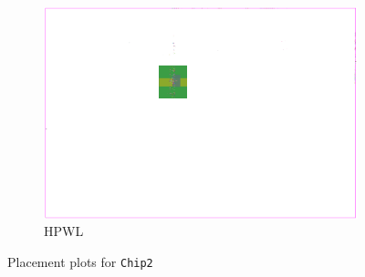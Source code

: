 \begin{figure}[p]
 \begin{subfigure}{.6\textwidth}
  \includegraphics[width=\textwidth]{hpwl_qclique_comparisons/placement_Chip2_HPWL.png}
  \caption{HPWL}
 \end{subfigure}

 \caption{Placement plots for \texttt{Chip2}}
 \label{fig:placement_Chip2_depending_on_objective_function}
\end{figure}


